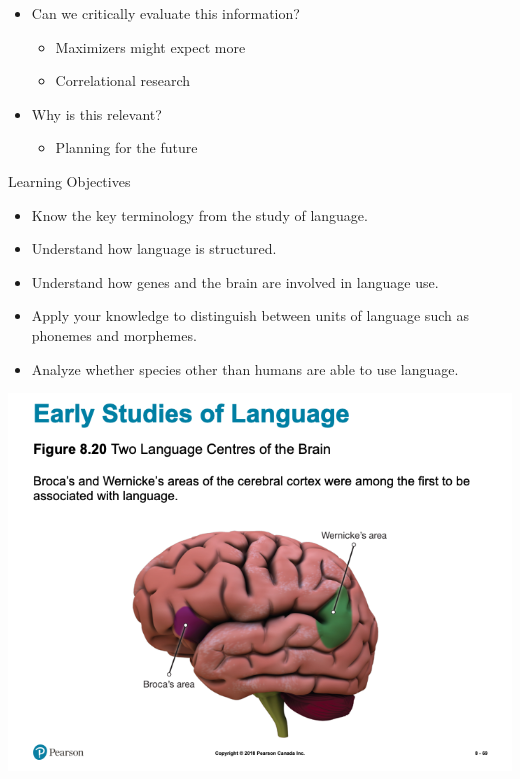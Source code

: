 \documentclass[
]{book}
\providecommand{\tightlist}{%
  \setlength{\itemsep}{0pt}\setlength{\parskip}{0pt}}
\begin{document}
\begin{reflect}
\begin{itemize}
\tightlist
\item
  Can we critically evaluate this information?

  \begin{itemize}
  \tightlist
  \item
    Maximizers might expect more\\
  \item
    Correlational research\\
  \end{itemize}
\item
  Why is this relevant?

  \begin{itemize}
  \tightlist
  \item
    Planning for the future
  \end{itemize}
\end{itemize}

Learning Objectives

\begin{itemize}
\tightlist
\item
  Know the key terminology from the study of language.\\
\item
  Understand how language is structured.\\
\item
  Understand how genes and the brain are involved in language use.\\
\item
  Apply your knowledge to distinguish between units of language such as phonemes and morphemes.\\
\item
  Analyze whether species other than humans are able to use language.
\end{itemize}

\includegraphics{assets/unit_1/slide_69.png}


\end{reflect}
\end{document}
